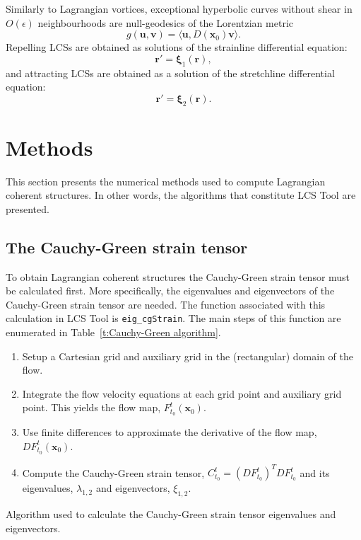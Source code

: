 \documentclass{article}
\begin{document}
Similarly to Lagrangian vortices, exceptional hyperbolic curves without shear in $O(\epsilon)$ neighbourhoods are null-geodesics of the Lorentzian metric
\[
g(\boldsymbol u, \boldsymbol v) = \langle \boldsymbol u, D(\boldsymbol x_0) \boldsymbol v \rangle.
\]
Repelling LCSs are obtained as solutions of the strainline differential equation:
\[
\boldsymbol r' = \boldsymbol \xi_1(\boldsymbol r),
\]
and attracting LCSs are obtained as a solution of the stretchline differential equation:
\[
\boldsymbol r' = \boldsymbol \xi_2(\boldsymbol r).
\]

\section{Methods}

This section presents the numerical methods used to compute Lagrangian coherent structures. In other words, the algorithms that constitute LCS Tool are presented.

\subsection{The Cauchy-Green strain tensor}

To obtain Lagrangian coherent structures the Cauchy-Green strain tensor must be calculated first. More specifically, the eigenvalues and eigenvectors of the Cauchy-Green strain tensor are needed. The function associated with this calculation in LCS Tool is \texttt{eig\_cgStrain}. The main steps of this function are enumerated in Table~\ref{t:Cauchy-Green algorithm}.

\begin{table}
\begin{enumerate}
\item Setup a Cartesian grid and auxiliary grid in the (rectangular) domain of the flow.
\item Integrate the flow velocity equations at each grid point and auxiliary grid point. This yields the flow map, $F_{t_0}^t(\boldsymbol x_0)$.
\item Use finite differences to approximate the derivative of the flow map, $D F_{t_0}^t(\boldsymbol x_0)$.
\item Compute the Cauchy-Green strain tensor, $C_{t_0}^t = \left(D F_{t_0}^t\right)^T D F_{t_0}^t$ and its eigenvalues, $\lambda_{1,2}$ and eigenvectors, $\xi_{1,2}$.
\end{enumerate}
\caption{Algorithm used to calculate the Cauchy-Green strain tensor eigenvalues and eigenvectors.}
\label{t:Cauchy-Green algorithm}
\end{table}
\end{document}
